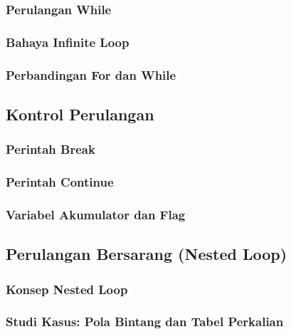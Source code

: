 \documentclass[12pt,a4paper]{article}
\begin{document}
\subsubsection{Perulangan While}

\subsubsection{Bahaya Infinite Loop}

\subsubsection{Perbandingan For dan While}

\subsection{Kontrol Perulangan}

\subsubsection{Perintah Break}

\subsubsection{Perintah Continue}

\subsubsection{Variabel Akumulator dan Flag}

\subsection{Perulangan Bersarang (Nested Loop)}

\subsubsection{Konsep Nested Loop}

\subsubsection{Studi Kasus: Pola Bintang dan Tabel Perkalian}
\end{document}
